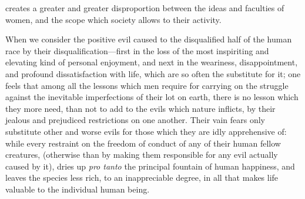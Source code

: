 \documentclass[12pt]{report}
\begin{document}
creates a greater and greater disproportion between the ideas and faculties of women, and the scope which society allows to their activity.

When we consider the positive evil caused to the disqualified half of the human race by their disqualification—first in the loss of the most inspiriting and elevating kind of personal enjoyment, and next in the weariness, disappointment, and profound dissatisfaction with life, which are so often the substitute for it; one feels that among all the lessons which men require for carrying on the struggle against the inevitable imperfections of their lot on earth, there is no lesson which they more need, than not to add to the evils which nature inflicts, by their jealous and prejudiced restrictions on one another. Their vain fears only substitute other and worse evils for those which they are idly apprehensive of: while every restraint on the freedom of conduct of any of their human fellow creatures, (otherwise than by making them responsible for any evil actually caused by it), dries up \emph{pro tanto} the principal fountain of human happiness, and leaves the species less rich, to an inappreciable degree, in all that makes life valuable to the individual human being.
\end{document}
